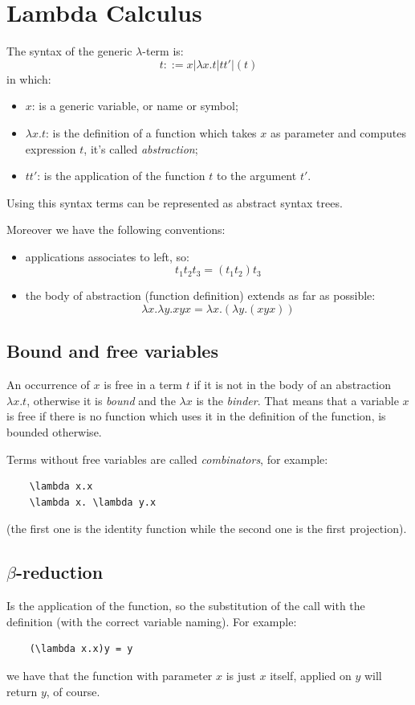 \section{Lambda Calculus}
The syntax of the generic $\lambda$-term is:
$$
    t ::= x | \lambda x.t | t t' | (t)
$$
in which:
\begin{itemize}
    \item $x$: is a generic variable, or name or symbol;
    \item $\lambda x.t$: is the definition of a function which takes $x$ as parameter and computes expression $t$, it's called \emph{abstraction};
    \item $t t'$: is the application of the function $t$ to the argument $t'$.
\end{itemize}
Using this syntax terms can be represented as abstract syntax trees.

Moreover we have the following conventions:
\begin{itemize}
    \item applications associates to left, so:
    $$
        t_1 t_2 t_3 = (t_1 t_2) t_3
    $$

    \item the body of abstraction (function definition) extends as far as possible:
    $$
        \lambda x.\lambda y. x y x = \lambda x. (\lambda y. (x y x))
    $$
\end{itemize}

\subsection{Bound and free variables}
An occurrence of $x$ is free in a term $t$ if it is not in the body of an abstraction $\lambda x.t$, otherwise it is \emph{bound} and the $\lambda x$ is the \emph{binder}.
That means that a variable $x$ is free if there is no function which uses it in the definition of the function, is bounded otherwise.

Terms without free variables are called \emph{combinators}, for example:
\begin{verbatim}
    \lambda x.x
    \lambda x. \lambda y.x
\end{verbatim}
(the first one is the identity function while the second one is the first projection).

\subsection{$\beta$-reduction}
Is the application of the function, so the substitution of the call with the definition (with the correct variable naming).
For example:
\begin{verbatim}
    (\lambda x.x)y = y
\end{verbatim}
we have that the function with parameter $x$ is just $x$ itself, applied on $y$ will return $y$, of course.

